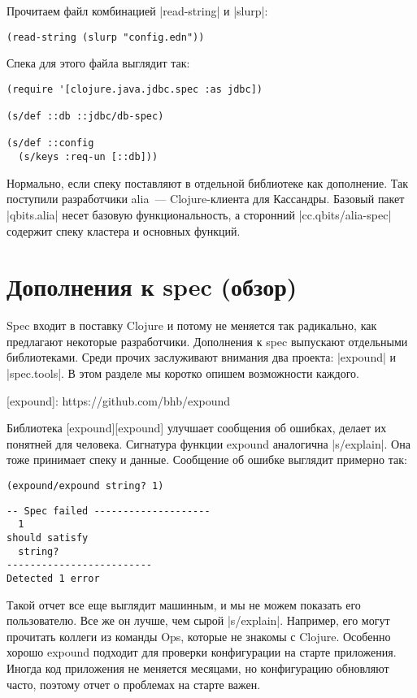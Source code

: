 Прочитаем файл комбинацией \spverb|read-string| и \spverb|slurp|:

\begin{verbatim}
(read-string (slurp "config.edn"))
\end{verbatim}

Спека для этого файла выглядит так:

\begin{verbatim}
(require '[clojure.java.jdbc.spec :as jdbc])

(s/def ::db ::jdbc/db-spec)

(s/def ::config
  (s/keys :req-un [::db]))
\end{verbatim}

Нормально, если спеку поставляют в отдельной библиотеке как дополнение. Так
поступили разработчики alia~--- Clojure-клиента для Кассандры. Базовый пакет
\spverb|qbits.alia| несет базовую функциональность, а сторонний \spverb|cc.qbits/alia-spec|
содержит спеку кластера и основных функций.

\section{Дополнения к spec (обзор)}

Spec входит в поставку Clojure и потому не меняется так радикально, как
предлагают некоторые разработчики. Дополнения к spec выпускают отдельными
библиотеками. Среди прочих заслуживают внимания два проекта: \spverb|expound| и
\spverb|spec.tools|. В этом разделе мы коротко опишем возможности каждого.

[expound]: https://github.com/bhb/expound

Библиотека [expound][expound] улучшает сообщения об ошибках, делает их понятней
для человека. Сигнатура функции expound аналогична \spverb|s/explain|. Она тоже принимает
спеку и данные. Сообщение об ошибке выглядит примерно так:

\begin{verbatim}
(expound/expound string? 1)
\end{verbatim}

\begin{verbatim}
-- Spec failed --------------------
  1
should satisfy
  string?
-------------------------
Detected 1 error
\end{verbatim}

Такой отчет все еще выглядит машинным, и мы не можем показать его
пользователю. Все же он лучше, чем сырой \spverb|s/explain|. Например, его могут
прочитать коллеги из команды Ops, которые не знакомы с Clojure. Особенно хорошо
expound подходит для проверки конфигурации на старте приложения. Иногда код
приложения не меняется месяцами, но конфигурацию обновляют часто, поэтому отчет
о проблемах на старте важен.

